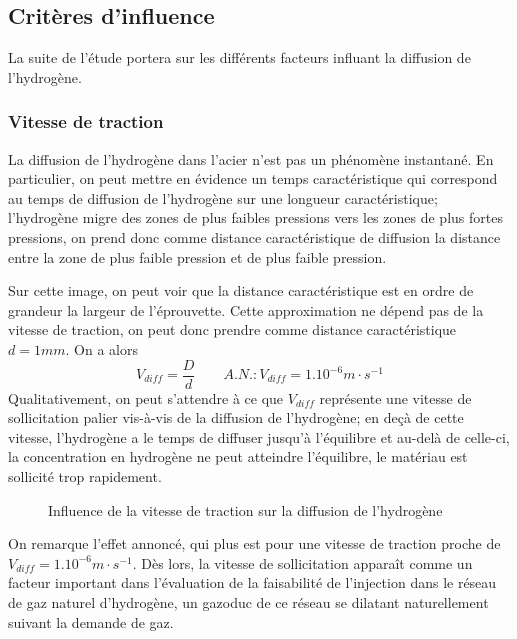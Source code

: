 \documentclass[a4paper, french, 11pt]{article}
\newcommand{\nuance}[1]{\og #1 \fg}
\begin{document}
    \subsection{Critères d'influence}
    La suite de l'étude portera sur les différents facteurs influant la diffusion de l'hydrogène.

    \subsubsection{Vitesse de traction}
    La diffusion de l'hydrogène dans l'acier n'est pas un phénomène instantané. En particulier, on peut mettre en évidence un temps caractéristique qui correspond au temps de diffusion de l'hydrogène sur une longueur caractéristique;
    l'hydrogène migre des zones de plus faibles pressions vers les zones de plus fortes pressions, on prend donc comme distance caractéristique de diffusion la distance entre la zone de plus faible pression et de plus faible pression.


    Sur cette image, on peut voir que la distance caractéristique est en ordre de grandeur la largeur de l'éprouvette. Cette approximation ne dépend pas de la vitesse de traction, on peut donc prendre comme distance caractéristique \(d = 1mm\). On a alors \[V_{diff} = \frac{D}{d} \qquad A.N. : V_{diff} = 1.10^{-6}m \cdot s^{-1}\]
    Qualitativement, on peut s'attendre à ce que \(V_{diff}\) représente une vitesse de sollicitation \nuance{palier} vis-à-vis de la diffusion de l'hydrogène; en deçà de cette vitesse, l'hydrogène a \nuance{le temps} de diffuser jusqu'à l'équilibre et au-delà de celle-ci, la concentration en hydrogène ne peut atteindre l'équilibre, le matériau est sollicité trop rapidement.
    
    \begin{figure}[ht]
        \centering
        \caption{Influence de la vitesse de traction sur la diffusion de l'hydrogène}
        \label{anim:3vitesse}
    \end{figure}

    On remarque l'effet annoncé, qui plus est pour une vitesse de traction proche de \(V_{diff} = 1.10^{-6}m \cdot s^{-1}\). Dès lors, la vitesse de sollicitation apparaît comme un facteur important dans l'évaluation de la faisabilité de l'injection dans le réseau de gaz naturel d'hydrogène, un gazoduc de ce réseau se dilatant naturellement suivant la demande de gaz.
\end{document}
